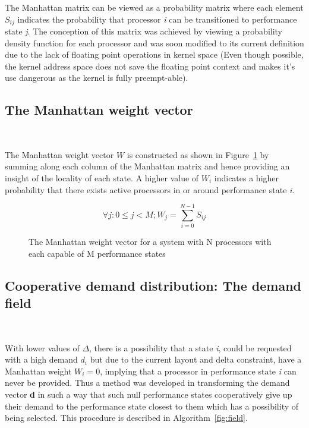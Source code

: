 The Manhattan matrix can be viewed as a probability matrix where each element
$S_{ij}$ indicates the probability that processor \textit{i} can be transitioned to
performance state \textit{j}. The conception of this matrix was achieved by viewing
a probability density function for each processor and was soon modified to its
current definition due to the lack of floating point operations in kernel space 
(Even though possible, the kernel address space does not save the floating point 
context and makes it's use dangerous as the kernel is fully preempt-able).

\subsection{The Manhattan weight vector}~\label{sec:weight}

The Manhattan weight vector $W$ is constructed as shown in Figure~\ref{fig:state_weight} by summing along each column 
of the Manhattan matrix and hence providing an insight of the locality of each state. A higher value of $W_i$ 
indicates a higher probability that there exists active processors in or around
performance state \textit{i}. 

\begin{figure}[h!]
\centering
\begin{equation*}
    \forall j: 0 \leq j < M; W_j = \displaystyle\sum_{i=0}^{N-1} {S_{ij}}
\end{equation*}
\caption{The Manhattan weight vector for a system with N processors with each capable of M performance states}
\label{fig:state_weight}
\end{figure}

\subsection{Cooperative demand distribution: The demand field}~\label{sec:field}

With lower values of $\Delta$, there is a possibility that a state \textit{i},
could be requested with a high demand $d_i$ but due to the current layout and 
delta constraint, have a Manhattan weight $W_i = 0$, implying that a processor 
in performance state \textit{i} can never be provided.
Thus a method was developed in transforming the demand vector \textbf{d}
in such a way that such null performance states cooperatively give up their demand
to the performance state closest to them which has a possibility of being selected. 
This procedure is described in Algorithm~\ref{fig:field}.


